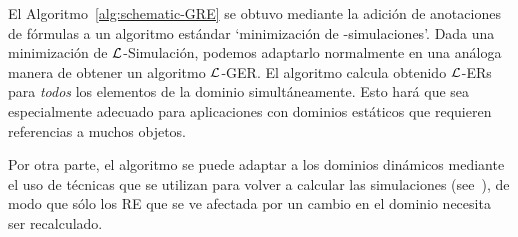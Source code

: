 
%


El Algoritmo~\ref{alg:schematic-GRE} se obtuvo mediante la adici\'on de anotaciones de f\'ormulas
a un algoritmo est\'andar `minimizaci\'on de \EL-simulaciones'. Dada una minimizaci\'on de
$\mathcal{L}$-Simulaci\'on, podemos adaptarlo normalmente en una an\'aloga
manera de obtener un algoritmo $\mathcal{L}$-GER.
El algoritmo calcula obtenido $\mathcal{L}$-ERs para \emph{todos} los elementos de la
dominio simult\'aneamente.
Esto har\'a que sea especialmente adecuado para aplicaciones con
dominios est\'aticos que requieren referencias a muchos objetos.


Por otra parte, el algoritmo se puede adaptar
a los dominios din\'amicos mediante el uso de t\'ecnicas que se utilizan para volver a calcular las simulaciones (see~\cite{saha:incre07}),
de modo que s\'olo los RE que se ve afectada por un cambio en el dominio necesita ser
recalculado.


